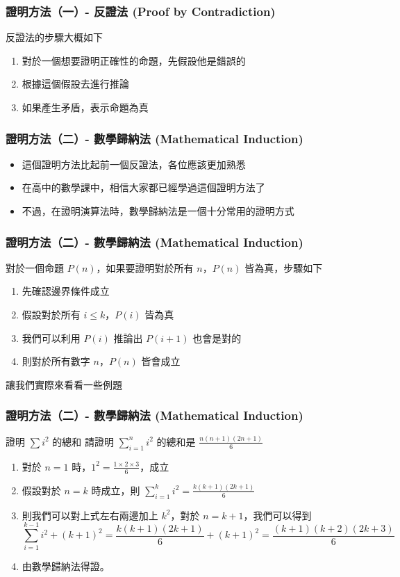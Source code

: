 \documentclass[aspectratio=169]{beamer}
\begin{document}
\begin{frame}
\frametitle{證明方法（一）- 反證法 (Proof by Contradiction)}
    反證法的步驟大概如下
    \begin{enumerate}
        \item 對於一個想要證明正確性的命題，先假設他是錯誤的
        \item 根據這個假設去進行推論
        \item 如果產生矛盾，表示命題為真
    \end{enumerate}
\end{frame}

\begin{frame}
\frametitle{證明方法（二）- 數學歸納法 (Mathematical Induction)}
    \begin{itemize}
        \item 這個證明方法比起前一個反證法，各位應該更加熟悉
        \item 在高中的數學課中，相信大家都已經學過這個證明方法了
        \item 不過，在證明演算法時，數學歸納法是一個十分常用的證明方式
    \end{itemize}
\end{frame}

\begin{frame}
\frametitle{證明方法（二）- 數學歸納法 (Mathematical Induction)}
    對於一個命題 $P(n)$，如果要證明對於所有 $n$，$P(n)$ 皆為真，步驟如下
    \begin{enumerate}
        \item 先確認邊界條件成立
        \item 假設對於所有 $i \le k$，$P(i)$ 皆為真
        \item 我們可以利用 $P(i)$ 推論出 $P(i+1)$ 也會是對的
        \item 則對於所有數字 $n$，$P(n)$ 皆會成立
    \end{enumerate} \pause
    讓我們實際來看看一些例題
\end{frame}

\begin{frame}
\frametitle{證明方法（二）- 數學歸納法 (Mathematical Induction)}
    \begin{block}{證明 $\sum i^2$ 的總和}
        請證明 $\sum_{i=1}^n i^2$ 的總和是 $\frac{n(n+1)(2n+1)}{6}$
    \end{block}
    
    \begin{enumerate}
        \item<1-> 對於 $n=1$ 時，$1^2 = \frac{1 \times 2 \times 3}{6}$，成立
        \item<2-> 假設對於 $n = k$ 時成立，則 $\sum_{i=1}^{k} i^2 = \frac{k(k+1)(2k+1)}{6}$
        \item<3-> 則我們可以對上式左右兩邊加上 $k^2$，對於 $n=k+1$，我們可以得到 $$\sum_{i=1}^{k-1} i^2 + (k+1)^2 = \frac{k(k+1)(2k+1)}{6} + (k+1)^2 = \frac{(k+1)(k+2)(2k+3)}{6}$$
        \item<4-> 由數學歸納法得證。
    \end{enumerate}
\end{frame}
\end{document}

